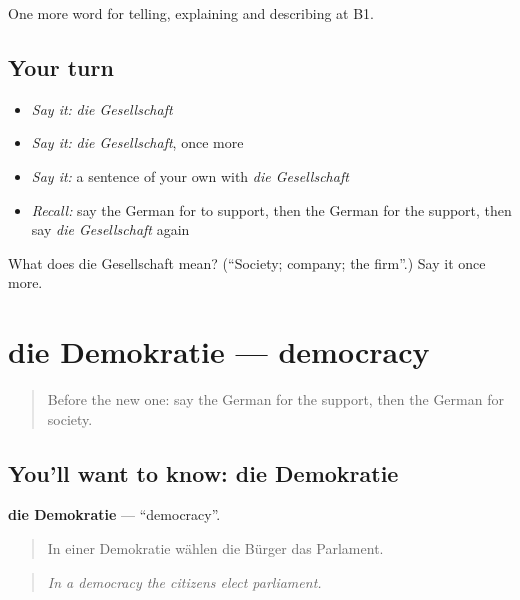 \begin{grammarlens}[title={What you've built}]
One more word for telling, explaining and describing at B1.
\end{grammarlens}

\subsection*{Your turn}
\begin{itemize}
\raggedright
  \item \emph{Say it:} \emph{die Gesellschaft}
  \item \emph{Say it:} \emph{die Gesellschaft}, once more
  \item \emph{Say it:} a sentence of your own with \emph{die Gesellschaft}
  \item \emph{Recall:} say the German for to support, then the German for the support, then say \emph{die Gesellschaft} again
\end{itemize}

\begin{tcolorbox}[breakable,colback=teal!4,colframe=teal!35!black,title={Before you move on}]
What does die Gesellschaft mean? (\textquotedblleft{}Society; company; the firm\textquotedblright{}.) Say it once more.
\end{tcolorbox}
\section[die Demokratie]{die Demokratie — democracy}

\label{lesson:GE-C358-demokratie}



\begin{quote}
Before the new one: say the German for the support, then the German for society.
\end{quote}

\subsection*{You'll want to know: die Demokratie}
\textbf{die Demokratie} — \textquotedblleft{}democracy\textquotedblright{}.

\begin{quote}
In einer Demokratie wählen die Bürger das Parlament.
\end{quote}

\begin{quote}
\emph{In a democracy the citizens elect parliament.}
\end{quote}

